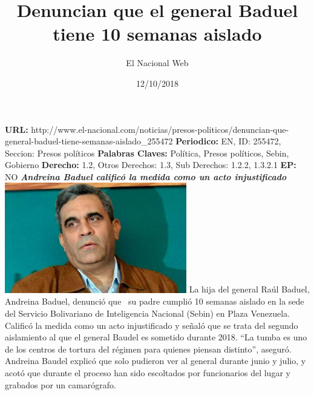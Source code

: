 \documentclass{article}%
\title{\textbf{Denuncian que el general Baduel tiene 10 semanas aislado}}%
\author{El Nacional Web}%
\date{12/10/2018}%
\begin{document}
%
\normalsize%
\maketitle%
\textbf{URL: }%
http://www.el{-}nacional.com/noticias/presos{-}politicos/denuncian{-}que{-}general{-}baduel{-}tiene{-}semanas{-}aislado\_255472\newline%
%
\textbf{Periodico: }%
EN, %
ID: %
255472, %
Seccion: %
Presos políticos\newline%
%
\textbf{Palabras Claves: }%
Política, Presos políticos, Sebin, Gobierno\newline%
%
\textbf{Derecho: }%
1.2, %
Otros Derechos: %
1.3, %
Sub Derechos: %
1.2.2, 1.3.2.1\newline%
%
\textbf{EP: }%
NO\newline%
\newline%
%
\textbf{\textit{Andreina Baduel calificó la medida como un acto injustificado~}}%
\newline%
\newline%
%
\includegraphics[width=300px]{77.jpg}%
\newline%
%
La hija del general Raúl Baduel, Andreina Baduel, denunció que~ su padre cumplió 10 semanas aislado en la sede del Servicio Bolivariano de Inteligencia Nacional (Sebin) en Plaza Venezuela.%
\newline%
%
Calificó la medida como un acto injustificado y señaló que se trata del segundo aislamiento al que el general Baudel es sometido durante 2018.%
\newline%
%
“La tumba es uno de los centros de tortura del régimen para quienes piensan distinto”, aseguró.%
\newline%
%
Andreina Baudel explicó que solo pudieron ver al general durante junio y julio, y acotó que durante el proceso han sido escoltados por funcionarios del lugar y grabados por un camarógrafo.%
\newline%
%
\end{document}

